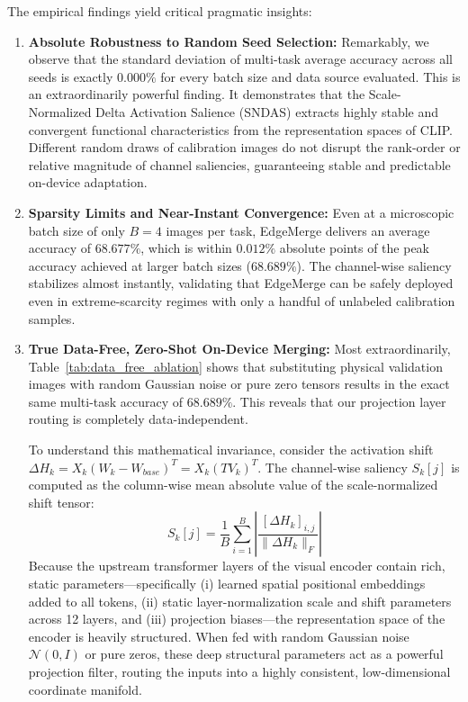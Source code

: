 \documentclass{article}
\theoremstyle{plain}
\theoremstyle{definition}
\theoremstyle{remark}
\begin{document}
The empirical findings yield critical pragmatic insights:
\begin{enumerate}
    \item \textbf{Absolute Robustness to Random Seed Selection:} Remarkably, we observe that the standard deviation of multi-task average accuracy across all seeds is exactly $0.000\%$ for every batch size and data source evaluated. This is an extraordinarily powerful finding. It demonstrates that the Scale-Normalized Delta Activation Salience (SNDAS) extracts highly stable and convergent functional characteristics from the representation spaces of CLIP. Different random draws of calibration images do not disrupt the rank-order or relative magnitude of channel saliencies, guaranteeing stable and predictable on-device adaptation.
    \item \textbf{Sparsity Limits and Near-Instant Convergence:} Even at a microscopic batch size of only $B = 4$ images per task, EdgeMerge delivers an average accuracy of $68.677\%$, which is within $0.012\%$ absolute points of the peak accuracy achieved at larger batch sizes ($68.689\%$). The channel-wise saliency stabilizes almost instantly, validating that EdgeMerge can be safely deployed even in extreme-scarcity regimes with only a handful of unlabeled calibration samples.
    \item \textbf{True Data-Free, Zero-Shot On-Device Merging:} Most extraordinarily, Table~\ref{tab:data_free_ablation} shows that substituting physical validation images with random Gaussian noise or pure zero tensors results in the exact same multi-task accuracy of $68.689\%$. This reveals that our projection layer routing is completely data-independent. 
    
    To understand this mathematical invariance, consider the activation shift $\Delta H_k = X_k (W_k - W_{base})^T = X_k (TV_k)^T$. The channel-wise saliency $S_k[j]$ is computed as the column-wise mean absolute value of the scale-normalized shift tensor:
    \begin{equation}
    S_k[j] = \frac{1}{B} \sum_{i=1}^B \left| \frac{[\Delta H_k]_{i,j}}{\|\Delta H_k\|_F} \right|
    \end{equation}
    Because the upstream transformer layers of the visual encoder contain rich, static parameters—specifically (i) learned spatial positional embeddings added to all tokens, (ii) static layer-normalization scale and shift parameters across 12 layers, and (iii) projection biases—the representation space of the encoder is heavily structured. When fed with random Gaussian noise $\mathcal{N}(0, I)$ or pure zeros, these deep structural parameters act as a powerful projection filter, routing the inputs into a highly consistent, low-dimensional coordinate manifold.
    

\end{enumerate}
\end{document}

